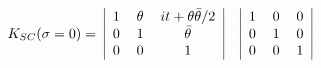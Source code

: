 \begin{equation}\label{Boundary0N2}
\begin{tabular}{c|ccc|c|ccc|c}
  & $1$ &$\theta$& $it+\theta\bar\theta/2$&&$1$&$0$&$0$&\\
$K_{SC}(\sigma=0)=$&$0$&$1$&$\bar\theta$&&$0$&$1$&$0$&\\
  & $0$ &$0$ &$1$&                       &$0$&$0$&$1$&\\
\end{tabular}\\
\end{equation}

